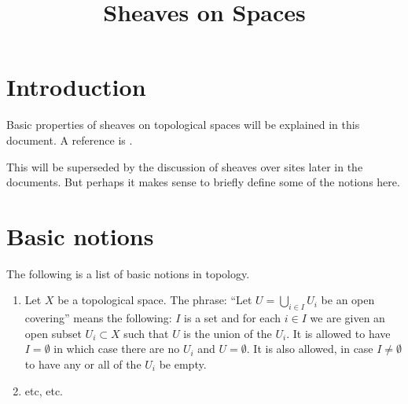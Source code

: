 

%


\title{Sheaves on Spaces}


\maketitle

\label{section-phantom}

\tableofcontents

\section{Introduction}
\label{section-introduction}

\noindent
Basic properties of sheaves on topological spaces
will be explained in this document.
A reference is \cite{Godement}.

\medskip\noindent
This will be superseded by the discussion of sheaves
over sites later in the documents. But perhaps it makes
sense to briefly define some of the notions here.











\section{Basic notions}
\label{section-sheaves-basic}

\noindent
The following is a list of basic notions in topology.

\begin{enumerate}
\item Let $X$ be a topological space. The phrase: ``Let
$U = \bigcup_{i \in I} U_i$ be an open covering'' means the
following: $I$ is a set and for each $i \in I$ we are given
an open subset $U_i \subset X$ such that $U$ is the
union of the $U_i$. It is allowed to have $I = \emptyset$
in which case there are no $U_i$ and $U = \emptyset$.
It is also allowed, in case $I \not = \emptyset$ to have
any or all of the $U_i$ be empty.
\item etc, etc.
\end{enumerate}












